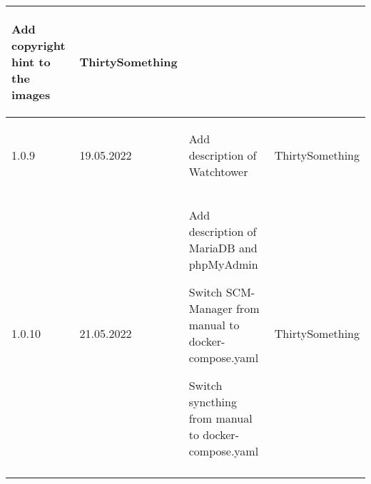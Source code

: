 \begin{tiny}
\begin{longtable}{ | p{} | p{} | P{0.49\textwidth} | p{0.15\textwidth} | }
\begin{tsLTItemize}
            \item Add copyright hint to the images
        \end{tsLTItemize}
                                 &
        ThirtySomething            \\
        \hline
        1.0.9                    &
        19.05.2022               &
        \begin{tsLTItemize}
            \item Add description of Watchtower
        \end{tsLTItemize}
                                 &
        ThirtySomething            \\
        \hline
        1.0.10                   &
        21.05.2022               &
        \begin{tsLTItemize}
            \item Add description of MariaDB and phpMyAdmin
            \item Switch SCM-Manager from manual to docker-compose.yaml
            \item Switch syncthing from manual to docker-compose.yaml
        \end{tsLTItemize}
                                 &
        ThirtySomething            \\
        \hline
    \end{longtable}
\end{tiny}
